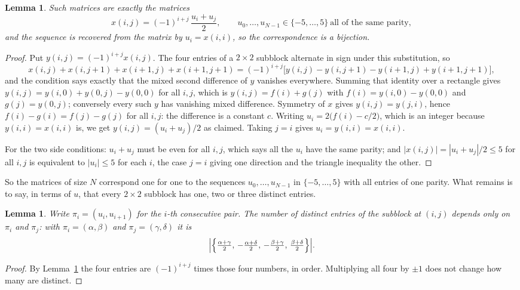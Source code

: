 \documentclass[11pt,a4paper]{article}
\theoremstyle{plain}
\newtheorem{lemma}[theorem]{Lemma}
\theoremstyle{definition}
\begin{document}
\begin{lemma}\label{lem:solve}
Such matrices are exactly the matrices
\[
x(i,j)=(-1)^{i+j}\,\frac{u_i+u_j}{2},
\qquad u_0,\dots,u_{N-1}\in\{-5,\dots,5\}\ \text{all of the same parity},
\]
and the sequence is recovered from the matrix by $u_i=x(i,i)$, so the correspondence is a
bijection.
\end{lemma}

\begin{proof}
Put $y(i,j)=(-1)^{i+j}x(i,j)$. The four entries of a $2\times2$ subblock alternate in sign
under this substitution, so
\[
x(i,j)+x(i,j{+}1)+x(i{+}1,j)+x(i{+}1,j{+}1)
=(-1)^{i+j}\bigl[y(i,j)-y(i,j{+}1)-y(i{+}1,j)+y(i{+}1,j{+}1)\bigr],
\]
and the condition says exactly that the mixed second difference of $y$ vanishes everywhere.
Summing that identity over a rectangle gives
$y(i,j)=y(i,0)+y(0,j)-y(0,0)$ for all $i,j$, which is $y(i,j)=f(i)+g(j)$ with
$f(i)=y(i,0)-y(0,0)$ and $g(j)=y(0,j)$; conversely every such $y$ has vanishing mixed
difference. Symmetry of $x$ gives $y(i,j)=y(j,i)$, hence $f(i)-g(i)=f(j)-g(j)$ for all $i,j$:
the difference is a constant $c$. Writing $u_i=2\bigl(f(i)-c/2\bigr)$, which is an integer
because $y(i,i)=x(i,i)$ is, we get $y(i,j)=(u_i+u_j)/2$ as claimed. Taking $j=i$ gives
$u_i=y(i,i)=x(i,i)$.

For the two side conditions: $u_i+u_j$ must be even for all $i,j$, which says all the $u_i$ have
the same parity; and $|x(i,j)|=|u_i+u_j|/2\le5$ for all $i,j$ is equivalent to $|u_i|\le5$
for each $i$, the case $j=i$ giving one direction and the triangle inequality the other.
\end{proof}

So the matrices of size $N$ correspond one for one to the sequences $u_0,\dots,u_{N-1}$ in
$\{-5,\dots,5\}$ with all entries of one parity. What remains is to say, in terms of $u$,
that every $2\times2$ subblock has one, two or three distinct entries.

\begin{lemma}\label{lem:block}
Write $\pi_i=(u_i,u_{i+1})$ for the $i$-th consecutive pair. The number of distinct entries of
the subblock at $(i,j)$ depends only on $\pi_i$ and $\pi_j$: with $\pi_i=(\alpha,\beta)$ and
$\pi_j=(\gamma,\delta)$ it is
\[
\Bigl|\Bigl\{\tfrac{\alpha+\gamma}{2},\,-\tfrac{\alpha+\delta}{2},\,
-\tfrac{\beta+\gamma}{2},\,\tfrac{\beta+\delta}{2}\Bigr\}\Bigr| .
\]
\end{lemma}

\begin{proof}
By Lemma~\ref{lem:solve} the four entries are $(-1)^{i+j}$ times those four numbers, in
order. Multiplying all four by $\pm1$ does not change how many are distinct.
\end{proof}
\end{document}
